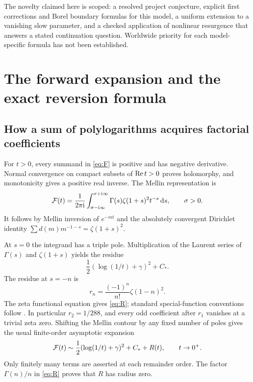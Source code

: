 The novelty claimed here is scoped: a resolved project conjecture, explicit
first corrections and Borel boundary formulas for this model, a uniform
extension to a vanishing slow parameter, and a checked application of
nonlinear resurgence that answers a stated continuation question.
Worldwide priority for each model-specific formula has not been established.

\section{The forward expansion and the exact reversion formula}\label{sec:forward}

\subsection{How a sum of polylogarithms acquires factorial coefficients}

For $t>0$, every summand in \eqref{eq:F} is positive and has negative
derivative. Normal convergence on compact subsets of $\operatorname{Re} t>0$ proves
holomorphy, and monotonicity gives a positive real inverse. The Mellin
representation is
\begin{equation}\label{eq:mellin}
 \mathcal F(t)=\frac1{2\pi\mathrm i}\int_{\sigma-\mathrm i\infty}^{\sigma+\mathrm i\infty}
       \Gamma(s)\zeta(1+s)^2t^{-s}\,\mathrm d s,\qquad \sigma>0.
\end{equation}
It follows by Mellin inversion of $e^{-mt}$ and the absolutely convergent
Dirichlet identity $\sum d(m)m^{-1-s}=\zeta(1+s)^2$.

At $s=0$ the integrand has a triple pole. Multiplication of the Laurent
series of $\Gamma(s)$ and $\zeta(1+s)$ yields the residue
\[
 \frac12(\log(1/t)+\gamma)^2+C_*.
\]
The residue at $s=-n$ is
\begin{equation}\label{eq:r-residue}
 r_n=\frac{(-1)^n}{n!}\zeta(1-n)^2.
\end{equation}
The zeta functional equation gives \eqref{eq:R}; standard special-function
conventions follow \cite{DLMF}. In particular $r_2=1/288$,
and every odd coefficient after $r_1$ vanishes at a trivial zeta zero.
Shifting the Mellin contour by any fixed number of poles gives the usual
finite-order asymptotic expansion
\begin{equation}\label{eq:forward-asym}
 \mathcal F(t)\sim\frac12(\log(1/t)+\gamma)^2+C_*+R(t),
 \qquad t\to0^+.
\end{equation}
Only finitely many terms are asserted at each remainder order. The
factor $\Gamma(n)/n$ in \eqref{eq:R} proves that $R$ has radius zero.

